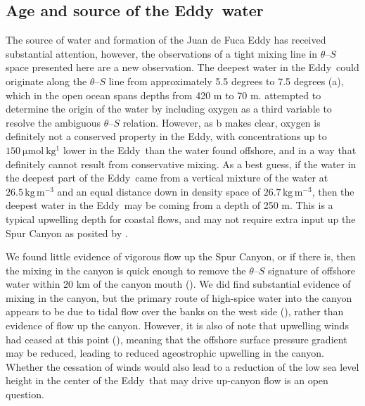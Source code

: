 \documentclass[draft]{agujournal2019}
\newcommand*{\Eddy}{{\sc Eddy}}
\begin{document}
\subsection{Age and source of the \Eddy\ water}

The source of water and formation of the Juan de Fuca Eddy has received substantial attention, however, the observations of a tight mixing line in $\theta$--$S$ space presented here are a new observation.  The deepest water in the \Eddy\ could originate along the $\theta$--$S$ line from approximately 5.5 degrees to 7.5 degrees (a), which in the open ocean spans depths from 420 m to 70 m.   attempted to determine the origin of the water by including oxygen as a third variable to resolve the ambiguous $\theta$--$S$ relation.  However, as b makes clear, oxygen is definitely not a conserved property in the \Eddy, with concentrations up to $150 \ \mathrm{\mu mol\ kg^{1}}$ lower in the \Eddy\ than the water found offshore, and in a way that definitely cannot result from conservative mixing.  As a best guess, if the water in the deepest part of the \Eddy\ came from a vertical mixture of the water at $26.5\,\mathrm{kg\,m^{-3}}$ and an equal distance down in density space of $26.7\,\mathrm{kg\,m^{-3}}$, then the deepest water in the \Eddy\ may be coming from a depth of 250 m.  This is a typical upwelling depth for coastal flows, and may not require extra input up the Spur Canyon as posited by .

We found little evidence of vigorous flow up the Spur Canyon, or if there is, then the mixing in the canyon is quick enough to remove the $\theta$--$S$ signature of offshore water within 20 km of the canyon mouth ().  We did find substantial evidence of mixing in the canyon, but the primary route of high-spice water into the canyon appears to be due to tidal flow over the banks on the west side (), rather than evidence of flow up the canyon.  However, it is also of note that upwelling winds had ceased at this point (), meaning that the offshore surface pressure gradient may be reduced, leading to reduced ageostrophic upwelling in the canyon.  Whether the cessation of winds would also lead to a reduction of the low sea level height in the center of the \Eddy\ that may drive up-canyon flow is an open question.
\end{document}
